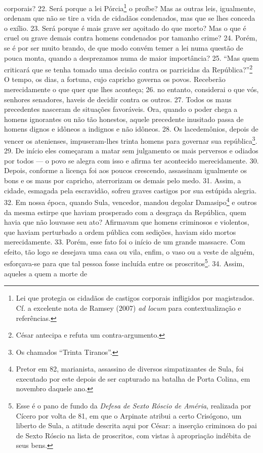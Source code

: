 corporais? 22. Será porque a lei Pórcia\footnote{Lei  que protegia os cidadãos
de castigos corporais infligidos por magistrados. Cf. a excelente nota de
Ramsey (2007) \emph{ad locum} para contextualização e referências.} o proíbe?
Mas as outras leis, igualmente, ordenam que não se tire a vida de cidadãos
condenados, mas que se lhes conceda o exílio. 23. Será porque é mais grave ser
açoitado do que morto? Mas o que é cruel ou grave demais contra homens
condenados por tamanho crime? 24. Porém, se é por ser muito brando, de que modo
convém temer a lei numa questão de pouca monta, quando a desprezamos numa de
maior importância? 25. “Mas quem criticará que se tenha tomado uma decisão
contra os parricidas da República?”\footnote{César antecipa e refuta um
contra-argumento.} O tempo, os dias, a fortuna, cujo capricho governa os povos.
Receberão merecidamente o que quer que lhes aconteça; 26. no entanto,
considerai o que vós, senhores senadores, haveis de decidir contra os outros.
27. Todos os maus precedentes nasceram de situações favoráveis. Ora, quando o poder
chega a homens ignorantes ou não tão honestos, aquele precedente inusitado passa de
homens dignos e idôneos a indignos e não idôneos. 28. Os lacedemônios, depois
de vencer os atenienses, impuseram-lhes trinta homens para governar sua
república\footnote{Os chamados ``Trinta Tiranos''.}. 29. De início eles
começaram a matar sem julgamento os mais perversos e odiados por todos --- o povo
se alegra com isso e afirma ter acontecido merecidamente. 30. Depois, conforme
a licença foi aos poucos crescendo, assassinam igualmente os bons e os maus por
capricho, aterrorizam os demais pelo medo. 31. Assim, a cidade, esmagada pela
escravidão, sofreu graves castigos por sua estúpida alegria. 32. Em nossa
época, quando Sula, vencedor, mandou degolar Damasipo\footnote{Pretor em 82,
marianista, assassino de diversos simpatizantes de Sula, foi executado por este
depois de ser capturado na batalha de Porta Colina, em novembro daquele ano.} e
outros da mesma estirpe que haviam prosperado com a desgraça da República, quem
havia que não louvasse seu ato? Afirmavam que homens criminosos e violentos,
que haviam perturbado a ordem pública com sedições, haviam sido mortos
merecidamente. 33. Porém, esse fato foi o início de um grande massacre. Com
efeito, tão logo se desejava uma casa ou vila, enfim, o vaso ou a veste de
alguém, esforçava-se para que tal pessoa fosse incluída entre os
proscritos\footnote{Esse é o pano de fundo da \emph{Defesa de Sexto Róscio de
Améria}, realizada por Cícero por volta de 81, em que o Arpinate atribui a certo
Crisógono, um liberto de Sula, a atitude descrita aqui por César: a inserção
criminosa do pai de Sexto Róscio na lista de proscritos, com vistas à
apropriação indébita de seus bens.}. 34. Assim, aqueles a quem a morte de
